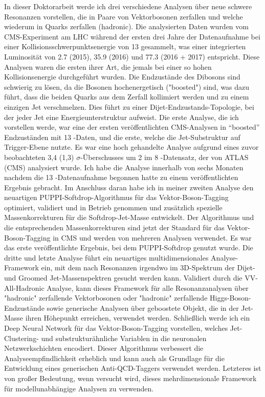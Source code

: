 \small
\noindent In dieser Doktorarbeit werde ich drei verschiedene Analysen über neue schwere Resonanzen vorstellen, die in Paare von Vektorbosonen zerfallen und welche wiederum in Quarks zerfallen (hadronic). Die analysierten Daten wurden vom CMS-Experiment am LHC während der ersten drei Jahre der Datenaufnahme bei einer Kollisionsschwerpunktsenergie von 13 \TeV gesammelt, was einer integrierten Luminosität von 2.7 (2015), 35.9 (2016) und 77.3 (2016 + 2017) \fbinv entspricht. Diese Analysen waren die ersten ihrer Art, die jemals bei einer so hohen Kollisionsenergie durchgeführt wurden. Die Endzustände des Dibosons sind schwierig zu lösen, da die Bosonen hochenergetisch ("boosted") sind, was dazu führt, dass die beiden Quarks aus dem Zerfall kollimiert werden und zu einem einzigen Jet verschmelzen. Dies führt zu einer Dijet-Endzustands-Topologie, bei der jeder Jet eine Energieunterstruktur aufweist. Die erste Analyse, die ich vorstellen werde, war eine der ersten veröffentlichten CMS-Analysen in “boosted” Endzuständen mit 13 \TeV-Daten, und die erste, welche die Jet-Substruktur auf Trigger-Ebene nutzte. Es war eine hoch gehandelte Analyse aufgrund eines zuvor beobachteten 3,4 (1,3) $\sigma$-Überschusses um 2 \TeV im 8 \TeV-Datensatz, der von ATLAS (CMS) analysiert wurde. Ich habe die Analyse innerhalb von sechs Monaten nachdem die 13 \TeV-Datenaufnahme begonnen hatte zu einem veröffentlichten Ergebnis gebracht. Im Anschluss daran habe ich in meiner zweiten Analyse den neuartigen PUPPI-Softdrop-Algorithmus für das Vektor-Boson-Tagging optimiert, validiert und in Betrieb genommen und zusätzlich spezielle Massenkorrekturen für die Softdrop-Jet-Masse entwickelt. Der Algorithmus und die entsprechenden Massenkorrekturen sind jetzt der Standard für das Vektor-Boson-Tagging in CMS und werden von mehreren Analysen verwendet. Es war das erste veröffentlichte Ergebnis, bei dem PUPPI-Softdrop genutzt wurde. Die dritte und letzte Analyse führt ein neuartiges multidimensionales Analyse-Framework ein, mit dem nach Resonanzen irgendwo im 3D-Spektrum der Dijet- und Groomed Jet-Massenspektren gesucht werden kann. Validiert durch die VV-All-Hadronic Analyse, kann dieses Framework für alle Resonanzanalysen über "hadronic" zerfallende Vektorbosonen oder "hadronic" zerfallende Higgs-Boson-Endzustände sowie generische Analysen über geboostete Objekt, die in der Jet-Masse ihren Höhepunkt erreichen, verwendet werden. 
Schließlich werde ich ein Deep Neural Network für das Vektor-Boson-Tagging vorstellen, welches Jet-Clustering- und substrukturähnliche Variablen in die neuronalen Netzwerkschichten encodiert. Dieser Algorithmus verbessert die Analyseempfindlichkeit erheblich und kann auch als Grundlage für die Entwicklung eines generischen Anti-QCD-Taggers verwendet werden. Letzteres ist von großer Bedeutung, wenn versucht wird, dieses mehrdimensionale Framework für modellunabhängige Analysen zu verwenden.